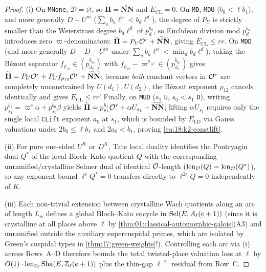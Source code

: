 \begin{proof}
(i) On \texttt{MNone}, $\mathcal{D} = \varnothing$, so $\widetilde{\mathbf{II}} = \widetilde{\mathbf{NN}}$ and $E_{\mathrm{CL}} = 0$. On \texttt{MD}, \texttt{MDU} ($b_0 < \ell b_1$), and more generally $D-U^m$ ($\sum_{u} b_u \ell^u < b_d \ell^d$), the degree of $P_U$ is strictly smaller than the Weierstrass degree $b_d \ell^d$ of $p_d^{b_d}$, so Euclidean division mod $p_d^{b_d}$ introduces zero $\varpi$-denominators: $\widetilde{\mathbf{II}} = P_U \mathcal{O}^r + \widetilde{\mathbf{NN}}$, giving $E_{\mathrm{CL}} \le rr$. On \texttt{MDD} (and more generally $D-D-U^m$ under $\sum_u b_u \ell^u < \min_d b_d \ell^d$), taking the B\'ezout separator $f_{\rho_{12}} \in (p_{d_2}^{b_{d_2}})$ with $f_{\rho_{12}} - \varpi^{\rho_{12}} \in (p_{d_1}^{b_{d_1}})$ gives $\widetilde{\mathbf{II}} = P_U \mathcal{O}^r + P_U f_{\rho_{12}}\mathcal{O}^r + \widetilde{\mathbf{NN}}$; because \emph{both} constant vectors in $\mathcal{O}^r$ are completely unconstrained by $U(d_1), U(d_2)$, the B\'ezout exponent $\rho_{12}$ cancels identically and gives $E_{\mathrm{CL}} \le rr$! Finally, on \texttt{MUD} ($s_1$ \texttt{U}, $s_0 < s_1$ \texttt{D}), writing $p_{s_1}^{b_1} = \varpi^c \alpha + p_{s_0}^{b_0}\beta$ yields $\widetilde{\mathbf{II}} = p_{s_1}^{b_1}\mathcal{O}^r + \alpha U_{s_1} + \widetilde{\mathbf{NN}}$; lifting $\alpha U_{s_1}$ requires only the single local \texttt{CLift} exponent $a_0$ at $s_1$, which is bounded by $E_{\mathrm{LD}}$ via Gauss valuations under $2b_0 \le \ell b_1$ and $2a_0 < b_1$, proving \eqref{eq:18:k2-constlift}.

(ii) For pure one-sided $U^K$ or $D^K$, Tate local duality identifies the Pontryagin dual $Q^*$ of the local Bloch--Kato quotient $Q$ with the corresponding unramified/crystalline Selmer dual of identical $\mathcal{O}$-length ($\operatorname{len}_{\mathcal{O}}(Q) = \operatorname{len}_{\mathcal{O}}(Q^*)$), so any exponent bound $\ell^e Q^* = 0$ transfers directly to $\ell^{2e} Q = 0$ independently of $K$.

(iii) Each non-trivial extension between crystalline Wach quotients along an arc of length $L_w$ defines a global Bloch--Kato cocycle in $\mathrm{Sel}(E, A_\ell(e+1))$ (since it is crystalline at all places above $\ell$ by \cref{thm:01:classical-automorphic-galois}(A3) and unramified outside the auxiliary supercuspidal primes, which are isolated by Green's cuspidal types in \cref{thm:17:green-weights}!). Controlling each arc via (i) across Rows~A--D therefore bounds the total twisted-place valuation loss at $\ell$ by $O(1) \cdot \operatorname{len}_{\mathbb{Z}_\ell}\mathrm{Sha}(E, \mathbb{Z}_\ell(e+1))$ plus the thin-gap $\ell^{-2}$ residual from Row~C.
\end{proof}

